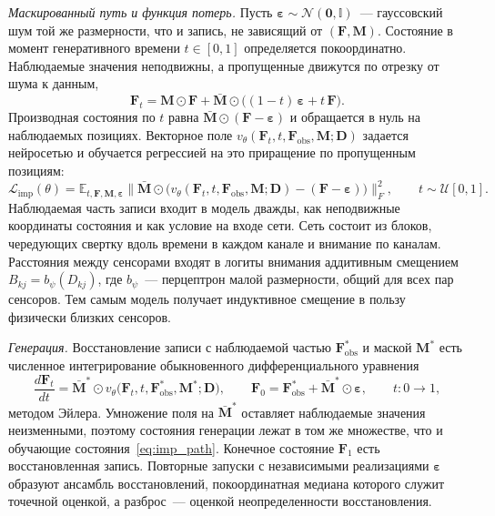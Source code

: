 \textit{Маскированный путь и функция потерь.} Пусть $\boldsymbol{\varepsilon} \sim \mathcal{N}(\mathbf{0}, \mathbb{I})$~--- гауссовский шум той же размерности, что и запись, не зависящий от $(\mathbf{F}, \mathbf{M})$. Состояние в момент генеративного времени $t \in [0,1]$ определяется покоординатно. Наблюдаемые значения неподвижны, а пропущенные движутся по отрезку от шума к данным,
\begin{equation}\label{eq:imp_path}
\mathbf{F}_t = \mathbf{M} \odot \mathbf{F} + \bar{\mathbf{M}} \odot \big( (1-t)\,\boldsymbol{\varepsilon} + t\,\mathbf{F} \big).
\end{equation}
Производная состояния по $t$ равна $\bar{\mathbf{M}} \odot (\mathbf{F} - \boldsymbol{\varepsilon})$ и обращается в нуль на наблюдаемых позициях. Векторное поле $v_{\theta}(\mathbf{F}_t, t, \mathbf{F}_{\mathrm{obs}}, \mathbf{M}; \mathbf{D})$ задается нейросетью и обучается регрессией на это приращение по пропущенным позициям:
\begin{equation}\label{eq:imp_loss}
\mathcal{L}_{\mathrm{imp}}(\theta) = \mathbb{E}_{t, \mathbf{F}, \mathbf{M}, \boldsymbol{\varepsilon}} \Big\| \bar{\mathbf{M}} \odot \big( v_{\theta}(\mathbf{F}_t, t, \mathbf{F}_{\mathrm{obs}}, \mathbf{M}; \mathbf{D}) - (\mathbf{F} - \boldsymbol{\varepsilon}) \big) \Big\|_F^2,
\qquad t \sim \mathcal{U}[0,1].
\end{equation}
Наблюдаемая часть записи входит в модель дважды, как неподвижные координаты состояния и как условие на входе сети. Сеть состоит из блоков, чередующих свертку вдоль времени в каждом канале и внимание по каналам. Расстояния между сенсорами входят в логиты внимания аддитивным смещением $B_{kj} = b_{\psi}(D_{kj})$, где $b_{\psi}$~--- перцептрон малой размерности, общий для всех пар сенсоров. Тем самым модель получает индуктивное смещение в пользу физически близких сенсоров.

\textit{Генерация.} Восстановление записи с наблюдаемой частью $\mathbf{F}_{\mathrm{obs}}^{*}$ и маской $\mathbf{M}^{*}$ есть численное интегрирование обыкновенного дифференциального уравнения
\begin{equation}\label{eq:imp_ode}
\frac{d\mathbf{F}_t}{dt} = \bar{\mathbf{M}}^{*} \odot v_{\theta}\big(\mathbf{F}_t, t, \mathbf{F}_{\mathrm{obs}}^{*}, \mathbf{M}^{*}; \mathbf{D}\big), \qquad \mathbf{F}_0 = \mathbf{F}_{\mathrm{obs}}^{*} + \bar{\mathbf{M}}^{*} \odot \boldsymbol{\varepsilon}, \qquad t \colon 0 \to 1,
\end{equation}
методом Эйлера. Умножение поля на $\bar{\mathbf{M}}^{*}$ оставляет наблюдаемые значения неизменными, поэтому состояния генерации лежат в том же множестве, что и обучающие состояния~\eqref{eq:imp_path}. Конечное состояние $\mathbf{F}_1$ есть восстановленная запись. Повторные запуски с независимыми реализациями $\boldsymbol{\varepsilon}$ образуют ансамбль восстановлений, покоординатная медиана которого служит точечной оценкой, а разброс~--- оценкой неопределенности восстановления.

